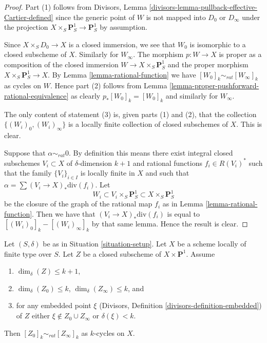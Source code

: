 \begin{proof}
Part (1) follows from
Divisors, Lemma \ref{divisors-lemma-pullback-effective-Cartier-defined}
since the generic point
of $W$ is not mapped into $D_0$ or $D_\infty$ under the projection
$X \times_S \mathbf{P}^1_S \to \mathbf{P}^1_S$ by assumption.

\medskip\noindent
Since $X \times_S D_0 \to X$ is a closed immersion, we see that $W_0$
is isomorphic to a closed subscheme of $X$. Similarly for $W_\infty$.
The morphism $p : W \to X$ is proper as a composition of
the closed immersion $W \to X \times_S \mathbf{P}^1_S$ and the
proper morphism $X \times_S \mathbf{P}^1_S \to X$. By
Lemma \ref{lemma-rational-function} we have
$[W_0]_k \sim_{rat} [W_\infty]_k$ as cycles on $W$. Hence part (2) follows from
Lemma \ref{lemma-proper-pushforward-rational-equivalence} as clearly
$p_*[W_0]_k = [W_0]_k$ and similarly for $W_\infty$.

\medskip\noindent
The only content of statement (3) is, given parts (1) and (2), that
the collection $\{(W_i)_0, (W_i)_\infty\}$ is a locally finite collection
of closed subschemes of $X$. This is clear.

\medskip\noindent
Suppose that $\alpha \sim_{rat} 0$.
By definition this means there exist integral closed subschemes
$V_i \subset X$ of $\delta$-dimension $k + 1$ and rational
functions $f_i \in R(V_i)^*$ such that the family
$\{V_i\}_{i \in I}$ is locally finite in $X$ and such that
$\alpha = \sum (V_i \to X)_*\text{div}(f_i)$.
Let
$$
W_i \subset V_i \times_S \mathbf{P}^1_S \subset X \times_S \mathbf{P}^1_S
$$
be the closure of the graph of the rational map $f_i$ as in
Lemma \ref{lemma-rational-function}.
Then we have that $(V_i \to X)_*\text{div}(f_i)$
is equal to $[(W_i)_0]_k - [(W_i)_\infty]_k$ by that same lemma.
Hence the result is clear.
\end{proof}

\begin{lemma}
\label{lemma-closed-subscheme-cross-p1}
Let $(S, \delta)$ be as in Situation \ref{situation-setup}.
Let $X$ be a scheme locally of finite type over $S$.
Let $Z$ be a closed subscheme of $X \times \mathbf{P}^1$.
Assume
\begin{enumerate}
\item $\dim_\delta(Z) \leq k + 1$,
\item $\dim_\delta(Z_0) \leq k$, $\dim_\delta(Z_\infty) \leq k$, and
\item for any embedded point $\xi$ (Divisors, Definition
\ref{divisors-definition-embedded}) of $Z$ either
$\xi \not \in Z_0 \cup Z_\infty$ or $\delta(\xi) < k$.
\end{enumerate}
Then $[Z_0]_k \sim_{rat} [Z_\infty]_k$ as $k$-cycles on $X$.
\end{lemma}

